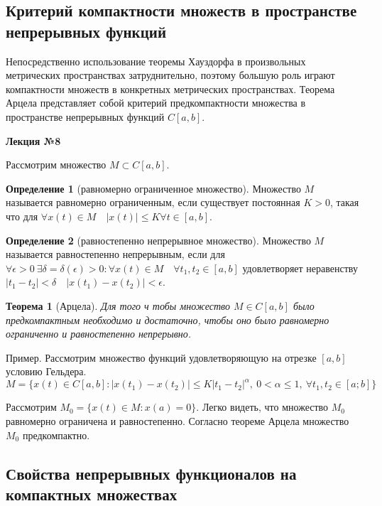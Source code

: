\documentclass[14pt,a4paper]{extarticle}
\newtheorem{theorem}{Теорема}[section]
\theoremstyle{definition}
\newtheorem{definition}{Определение}[section]
\theoremstyle{remark}
\renewcommand{\[}{\begin{dmath*}[compact]}
\renewcommand{\]}{\end{dmath*}}
\newcommand{\sep}{ , \ \allowbreak }
\begin{document}
\subsection{Критерий компактности множеств в пространстве непрерывных функций}

Непосредственно использование теоремы Хауздорфа в произвольных
метрических пространствах затруднительно, поэтому большую роль играют
компактности множеств в конкретных метрических пространствах.
Теорема Арцела представляет собой критерий предкомпактности множества
в пространстве непрерывных функций $C[a,b]$.

\textbf{Лекция №8}

Рассмотрим множество $M\subset C[a,b]$.

\begin{definition}[равномерно ограниченное множество]
  Множество $M$ называется равномерно ограниченным,
  если существует постоянная $K>0$, такая что для
  $\forall x(t)\in M \quad |x(t)|\leq K \forall t \in [a,b]$.
\end{definition}

\begin{definition}[равностепенно непрерывное множество]
  Множество $M$ называется равностепенно непрерывным, если для
  $\forall \epsilon > 0 \ \exists \delta = \delta(\epsilon)>0:
  \forall x(t)\in M\quad \forall t_1,t_2\in [a,b]$
  удовлетворяет неравенству $|t_1-t_2|<\delta \quad |x(t_1)-x(t_2)|<\epsilon$.
\end{definition}

\begin{theorem}[Арцела]
  Для того ч тобы множество $M\in C[a,b]$ было предкомпактным
  необходимо и достаточно, чтобы оно было равномерно ограниченно
  и равностепенно непрерывно.
\end{theorem}

Пример. Рассмотрим множество функций удовлетворяющую на отрезке $[a,b]$
условию Гельдера.
\[ M=\{x(t)\in C[a,b]: |x(t_1)-x(t_2)|\leq K|t_1-t_2|^\alpha \sep
0 < \alpha \leq 1 \sep \forall t_1,t_2 \in [a;b]\}\]

Рассмотрим $M_0=\{x(t)\in M:x(a)=0\}$.
Легко видеть, что множество $M_0$ равномерно ограничена и равностепенно.
Согласно теореме Арцела множество $M_0$ предкомпактно.

\subsection{Свойства непрерывных функционалов на компактных множествах}
\end{document}
